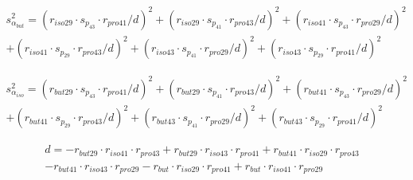 \begin{align}
     s_{\alpha_{but}}^2 = (r_{iso29} \cdot s_{p_43} \cdot r_{pro41}/d)^2 + (r_{iso29} \cdot s_{p_41} \cdot r_{pro43}/d)^2 + (r_{iso41} \cdot s_{p_43} \cdot r_{pro29}/d)^2 \\ \nonumber
     + (r_{iso41} \cdot  s_{p_29} \cdot r_{pro43}/d)^2 + (r_{iso43} \cdot s_{p_41} \cdot r_{pro29}/d)^2 + (r_{iso43} \cdot  s_{p_29} \cdot r_{pro41}/d)^2
\end{align}

\begin{align}
     s_{\alpha_{iso}}^2 = (r_{but29} \cdot s_{p_43} \cdot r_{pro41}/d)^2 + (r_{but29} \cdot s_{p_41} \cdot r_{pro43}/d)^2 + (r_{but41} \cdot s_{p_43} \cdot r_{pro29}/d)^2\\ \nonumber
     + (r_{but41} \cdot  s_{p_29} \cdot r_{pro43}/d)^2 + (r_{but43} \cdot s_{p_41} \cdot r_{pro29}/d)^2 + (r_{but43} \cdot  s_{p_29} \cdot r_{pro41}/d)^2
\end{align}

\begin{align}
    d = -r_{but29} \cdot r_{iso41} \cdot r_{pro43} + r_{but29} \cdot r_{iso43} \cdot r_{pro41} + r_{but41} \cdot r_{iso29} \cdot r_{pro43} \\ \nonumber
    - r_{but41} \cdot r_{iso43} \cdot r_{pro29} - r_{but} \cdot r_{iso29} \cdot r_{pro41} + r_{but} \cdot r_{iso41} \cdot r_{pro29}         
\end{align}
